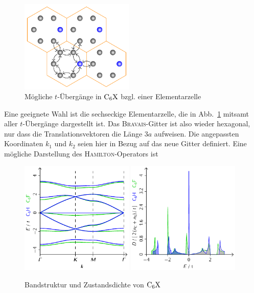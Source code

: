\documentclass[a4paper, 10pt, twoside, openany]{book} %
\begin{document}
\begin{figure}
    \centering
    \includegraphics[width=0.48\textwidth]{Abbildungen/Raumstrukturen/Sechstel.pdf}
    \caption{Mögliche $t$-Übergänge in $\rm C_6X$ bzgl. einer Elementarzelle}
    \label{Uebergaenge C6X}
\end{figure}
%
Eine geeignete Wahl ist die sechseckige Elementarzelle, die in Abb.~\ref{Uebergaenge C6X} mitsamt aller $t$-Übergänge dargestellt ist. Das \textsc{Bravais}-Gitter ist also wieder hexagonal, nur dass die Translationsvektoren die Länge $3 a$ aufweisen. Die angepassten Koordinaten $k_1$ und $k_2$ seien hier in Bezug auf das neue Gitter definiert. Eine mögliche Darstellung des \textsc{Hamilton}-Operators ist
%
\begin{figure}
    \includegraphics[width=0.48\textwidth]{Abbildungen/Bandstrukturen/C6X.pdf}
    \hfill
    \includegraphics[width=0.48\textwidth]{Abbildungen/Bandstrukturen/DOS_C6X.pdf}
    \caption{Bandstruktur und Zustandsdichte von $\rm C_6X$}
    \label{C6X}
\end{figure}
\end{document}
